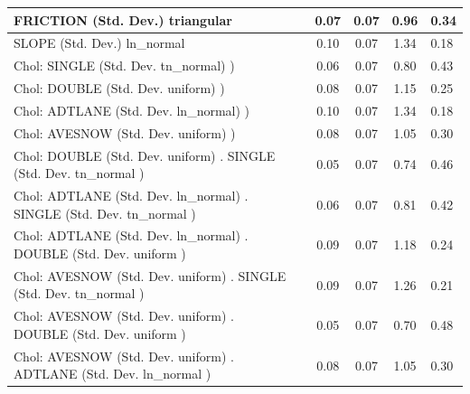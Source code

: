 \begin{table}
\begin{center}
\begin{tabular}{|l|l|c|c|c|l|}
			\hline
			FRICTION (Std. Dev.) triangular &  & 0.07 & 0.07 & 0.96 & 0.34 \\
			\hline
			SLOPE (Std. Dev.) ln_normal &  & 0.10 & 0.07 & 1.34 & 0.18 \\
			\hline
			 Chol: SINGLE (Std. Dev. tn_normal) ) &  & 0.06 & 0.07 & 0.80 & 0.43 \\
			\hline
			 Chol: DOUBLE (Std. Dev. uniform) ) &  & 0.08 & 0.07 & 1.15 & 0.25 \\
			\hline
			 Chol: ADTLANE (Std. Dev. ln_normal) ) &  & 0.10 & 0.07 & 1.34 & 0.18 \\
			\hline
			 Chol: AVESNOW (Std. Dev. uniform) ) &  & 0.08 & 0.07 & 1.05 & 0.30 \\
			\hline
			 Chol: DOUBLE (Std. Dev. uniform) . SINGLE (Std. Dev.   tn_normal ) &  & 0.05 & 0.07 & 0.74 & 0.46 \\
			\hline
			 Chol: ADTLANE (Std. Dev. ln_normal) . SINGLE (Std. Dev.   tn_normal ) &  & 0.06 & 0.07 & 0.81 & 0.42 \\
			\hline
			 Chol: ADTLANE (Std. Dev. ln_normal) . DOUBLE (Std. Dev.   uniform ) &  & 0.09 & 0.07 & 1.18 & 0.24 \\
			\hline
			 Chol: AVESNOW (Std. Dev. uniform) . SINGLE (Std. Dev.   tn_normal ) &  & 0.09 & 0.07 & 1.26 & 0.21 \\
			\hline
			 Chol: AVESNOW (Std. Dev. uniform) . DOUBLE (Std. Dev.   uniform ) &  & 0.05 & 0.07 & 0.70 & 0.48 \\
			\hline
			 Chol: AVESNOW (Std. Dev. uniform) . ADTLANE (Std. Dev.   ln_normal ) &  & 0.08 & 0.07 & 1.05 & 0.30 \\
			\hline
		\end{tabular}
	\end{center}
\end{table}